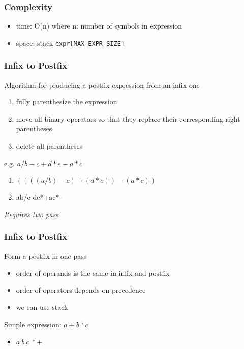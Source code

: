 \documentclass[newPxFont,sthlmFooter,nooffset]{beamer}
\begin{document}
\begin{frame}[t]
  \frametitle{Complexity}
  \begin{itemize}
  \item time: O(n) where n: number of symbols in expression
  \item space: stack \texttt{expr[MAX\_EXPR\_SIZE]}
  \end{itemize}
\end{frame}


\begin{frame}[t]
  \frametitle{Infix to Postfix}
Algorithm for producing a postfix expression from an infix one
\begin{enumerate}
\item fully parenthesize the expression
\item move all binary operators so that they replace their corresponding right parentheses
\item delete all parentheses
\end{enumerate}

e.g. $a/b-c+d*e-a*c$
\begin{enumerate}
\item $((((a/b)-c)+(d*e))-(a*c))$
\item ab/c-de*+ac*-
\end{enumerate}
\textit{Requires two pass}
\end{frame}

\begin{frame}[t]
  \frametitle{Infix to Postfix}
Form a postfix in one pass
\begin{itemize}
\item order of operands is the same in infix and postfix
\item order of operators depends on precedence
\item we can use stack
\end{itemize}

Simple expression: $a+b*c$
\begin{itemize}
\item $a~ b~ c~ * +$
\end{itemize}
\end{frame}
\end{document}
